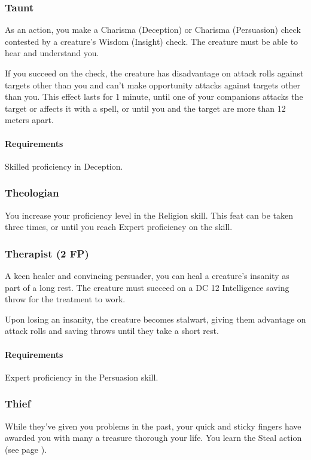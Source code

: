\subsubsection{Taunt} \label{feat::taunt}
    As an action, you make a Charisma (Deception) or Charisma (Persuasion) check contested by a creature's Wisdom (Insight) check.
    The creature must be able to hear and understand you.

    If you succeed on the check, the creature has disadvantage on attack rolls against targets other than you and can't make opportunity attacks against targets other than you.
    This effect lasts for 1 minute, until one of your companions attacks the target or affects it with a spell, or until you and the target are more than 12 meters apart.
    \paragraph{Requirements} Skilled proficiency in Deception.
\subsubsection{Theologian} \label{feat::theologian}
    You increase your proficiency level in the Religion skill.
    This feat can be taken three times, or until you reach Expert proficiency on the skill.
\subsubsection{Therapist (2 FP)} \label{feat::therapist}
    A keen healer and convincing persuader, you can heal a creature's insanity as part of a long rest.
    The creature must succeed on a DC 12 Intelligence saving throw for the treatment to work.

    Upon losing an insanity, the creature becomes stalwart, giving them advantage on attack rolls and saving throws until they take a short rest.
    \paragraph{Requirements} Expert proficiency in the Persuasion skill.
\subsubsection{Thief} \label{feat::thief}
    While they've given you problems in the past, your quick and sticky fingers have awarded you with many a treasure thorough your life.
    You learn the Steal action (see page \pageref{act::steal}).
